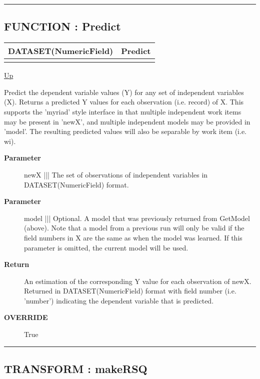 \rule{\textwidth}{0.4pt}
\subsection*{FUNCTION : Predict}
\hypertarget{ecldoc:linearregression.ols.predict}{}

{\renewcommand{\arraystretch}{1.5}
\begin{tabularx}{\textwidth}{|>{\raggedright\arraybackslash}l|X|}
\hline
\hspace{0pt}DATASET(NumericField) & Predict \\
\hline
\multicolumn{2}{|>{\raggedright\arraybackslash}X|}{\hspace{0pt}(DATASET(NumericField) newX, DATASET(Layout\_Model) model=GetModel)} \\
\hline
\end{tabularx}
}

\hyperlink{ecldoc:linearregression.ols}{Up}

\par
Predict the dependent variable values (Y) for any set of independent variables (X). Returns a predicted Y values for each observation (i.e. record) of X. This supports the 'myriad' style interface in that multiple independent work items may be present in 'newX', and multiple independent models may be provided in 'model'. The resulting predicted values will also be separable by work item (i.e. wi).

\par
\begin{description}
\item [\textbf{Parameter}] newX ||| The set of observations of independent variables in DATASET(NumericField) format.
\item [\textbf{Parameter}] model ||| Optional. A model that was previously returned from GetModel (above). Note that a model from a previous run will only be valid if the field numbers in X are the same as when the model was learned. If this parameter is omitted, the current model will be used.
\item [\textbf{Return}] An estimation of the corresponding Y value for each observation of newX. Returned in DATASET(NumericField) format with field number (i.e. 'number') indicating the dependent variable that is predicted.
\item [\textbf{OVERRIDE}] True
\end{description}

\rule{\textwidth}{0.4pt}
\subsection*{TRANSFORM : makeRSQ}
\hypertarget{ecldoc:linearregression.ols.makersq}{}

